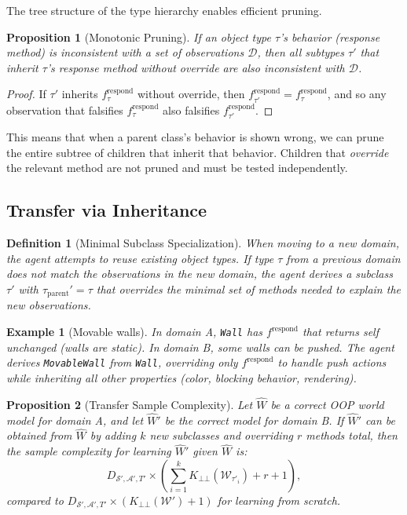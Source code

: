 \documentclass{article}
\newtheorem{definition}{Definition}
\newtheorem{proposition}{Proposition}
\newtheorem{example}{Example}
\newcommand{\calS}{\mathcal{S}}
\newcommand{\calA}{\mathcal{A}}
\newcommand{\calD}{\mathcal{D}}
\newcommand{\calW}{\mathcal{W}}
\begin{document}
The tree structure of the type hierarchy enables efficient pruning.

\begin{proposition}[Monotonic Pruning]
\label{prop:pruning}
If an object type $\tau$'s behavior (response method) is inconsistent with a
set of observations $\calD$, then all subtypes $\tau'$ that inherit $\tau$'s
response method without override are also inconsistent with $\calD$.
\end{proposition}

\begin{proof}
If $\tau'$ inherits $f_\tau^{\text{respond}}$ without override, then
$f_{\tau'}^{\text{respond}} = f_\tau^{\text{respond}}$, and so any observation
that falsifies $f_\tau^{\text{respond}}$ also falsifies
$f_{\tau'}^{\text{respond}}$.
\end{proof}

This means that when a parent class's behavior is shown wrong, we can prune
the entire subtree of children that inherit that behavior.  Children that
\emph{override} the relevant method are not pruned and must be tested
independently.

\subsection{Transfer via Inheritance}
\label{sec:transfer}

\begin{definition}[Minimal Subclass Specialization]
\label{def:minimal_spec}
When moving to a new domain, the agent attempts to reuse existing object types.
If type $\tau$ from a previous domain does not match the observations in the new
domain, the agent derives a subclass $\tau'$ with $\tau_{\text{parent}}' = \tau$
that overrides the minimal set of methods needed to explain the new observations.
\end{definition}

\begin{example}[Movable walls]
\label{ex:movable_wall}
In domain A, \texttt{Wall} has $f^{\text{respond}}$ that returns self unchanged
(walls are static).  In domain B, some walls can be pushed.  The agent derives
\texttt{MovableWall} from \texttt{Wall}, overriding only
$f^{\text{respond}}$ to handle push actions while inheriting all other
properties (color, blocking behavior, rendering).
\end{example}

\begin{proposition}[Transfer Sample Complexity]
\label{prop:transfer}
Let $\hat{W}$ be a correct OOP world model for domain A, and let
$\hat{W}'$ be the correct model for domain B.  If $\hat{W}'$ can be obtained
from $\hat{W}$ by adding $k$ new subclasses and overriding $r$ methods total,
then the sample complexity for learning $\hat{W}'$ given $\hat{W}$ is:
\begin{equation}
D_{\calS',\calA',T'} \times \left(\sum_{i=1}^{k}
    K_{\bot\!\!\bot}(\calW_{\tau'_i}) + r + 1\right),
\end{equation}
compared to $D_{\calS',\calA',T'} \times (K_{\bot\!\!\bot}(\calW') + 1)$ for
learning from scratch.
\end{proposition}
\end{document}
